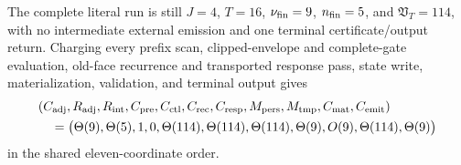 \begin{proposition}
The complete literal run is still
$J=4$, $T=16$, $\nu_{\rm fin}=9$, $n_{\rm fin}=5$, and
$\mathfrak V_T=114$, with no intermediate external emission and one terminal
certificate/output return.  Charging every prefix scan, clipped-envelope and
complete-gate evaluation, old-face recurrence and transported response pass,
state write, materialization, validation, and terminal output gives
\begin{equation}
 \begin{aligned}
 &(C_{\rm adj},R_{\rm adj},R_{\rm int},C_{\rm pre},C_{\rm ctl},C_{\rm rec},
 C_{\rm resp},M_{\rm pers},M_{\rm tmp},C_{\rm mat},C_{\rm emit})\\
 &\quad=\bigl(\Theta(9),\Theta(5),1,0,
       \Theta(114),\Theta(114),\Theta(114),
       \Theta(9),O(9),\Theta(114),\Theta(9)\bigr)
 \end{aligned}
 \label{eq:path-no-constant-bank-stop-eleven-vector}
\end{equation}
in the shared eleven-coordinate order.
\end{proposition}

